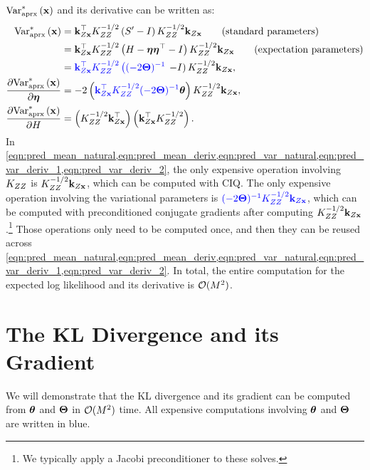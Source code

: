 $\text{Var}^*_\text{aprx} \left( \mathbf{x} \right)$ and its derivative can be written as:
%
\begin{align}
  \text{Var}^*_\text{aprx} \left( \mathbf{x} \right)
  &= \mathbf{k}_{Z \mathbf{x}}^\top K_{ZZ}^{-1/2} \left( S' - I \right) K_{ZZ}^{-1/2} \mathbf{k}_{Z \mathbf{x}}
  \tag{standard parameters} \\
  &= \mathbf{k}_{Z \mathbf{x}}^\top K_{ZZ}^{-1/2} \left( H - \boldsymbol{\eta} \boldsymbol{\eta}^\top - I \right) K_{ZZ}^{-1/2} \mathbf{k}_{Z \mathbf{x}}
  \tag{expectation parameters} \\
  &= {\color{blue} \mathbf{k}_{Z \mathbf{x}}^\top K_{ZZ}^{-1/2} \left((-2 \boldsymbol{\Theta})^{-1} \right.} \left. - I \right) K_{ZZ}^{-1/2} \mathbf{k}_{Z \mathbf{x}}
  \label{eqn:pred_var_natural},
  \\
  \frac{\partial \text{Var}^*_\text{aprx} \left( \mathbf{x} \right)}{\partial \boldsymbol{\eta}}
  &= -2 \left( {\color{blue} \mathbf{k}_{Z \mathbf{x}}^\top K_{ZZ}^{-1/2} (-2 \boldsymbol{\Theta})^{-1}} \boldsymbol{\theta} \right) K_{ZZ}^{-1/2} \mathbf{k}_{Z \mathbf{x}}
  \label{eqn:pred_var_deriv_1},
  \\
  \frac{\partial \text{Var}^*_\text{aprx} \left( \mathbf{x} \right)}{\partial H}
  &= \left( K_{ZZ}^{-1/2} \mathbf{k}_{Z \mathbf{x}}^\top \right) \left( \mathbf{k}_{Z \mathbf{x}}^\top K_{ZZ}^{-1/2} \right)
  \label{eqn:pred_var_deriv_2}.
\end{align}
%
In \cref{eqn:pred_mean_natural,eqn:pred_mean_deriv,eqn:pred_var_natural,eqn:pred_var_deriv_1,eqn:pred_var_deriv_2}, the only expensive operation involving $K_{ZZ}$ is $K_{ZZ}^{-1/2} \mathbf{k}_{Z \mathbf{x}}$, which can be computed with CIQ.
The only expensive operation involving the variational parameters is ${\color{blue} (-2 \boldsymbol{\Theta})^{-1} K_{ZZ}^{-1/2} \mathbf{k}_{Z \mathbf{x}}}$, which can be computed with preconditioned conjugate gradients after computing $K_{ZZ}^{-1/2} \mathbf{k}_{Z \mathbf{x}}$.\footnote{
  We typically apply a Jacobi preconditioner to these solves.
}
Those operations only need to be computed once, and then they can be reused across \cref{eqn:pred_mean_natural,eqn:pred_mean_deriv,eqn:pred_var_natural,eqn:pred_var_deriv_1,eqn:pred_var_deriv_2}.
In total, the entire computation for the expected log likelihood and its derivative is $\bigo{M^2}$.

\section{The KL Divergence and its Gradient}
We will demonstrate that the KL divergence and its gradient can be computed from $\boldsymbol{\theta}$ and $\boldsymbol{\Theta}$ in $\bigo{M^2}$ time.
All expensive computations involving $\boldsymbol{\theta}$ and $\boldsymbol{\Theta}$ are written in {\color{blue} blue}.

